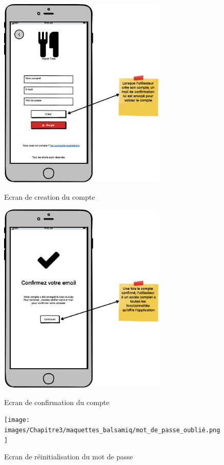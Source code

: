 \begin{figure}[!h]
    \centering
    \includegraphics[width=8cm]{images/Chapitre3/maquettes_balsamiq/Creer.png}
    \label{fig:creation}
    \caption{Ecran de creation du compte}
\end{figure} 
\begin{figure}[!h]
    \centering
    \includegraphics[width=8cm]{images/Chapitre3/maquettes_balsamiq/Confirmation.png}
    \label{fig:confirmation}
    \caption{Ecran de confirmation du compte}
\end{figure} 
\newpage
\begin{figure}[!h]
    \centering
    \texttt{[image: images/Chapitre3/maquettes\_balsamiq/mot\_de\_passe\_oublié.png]}
    \label{fig:mdpoublié}
    \caption{Ecran de réinitialisation du mot de passe}
\end{figure} 

